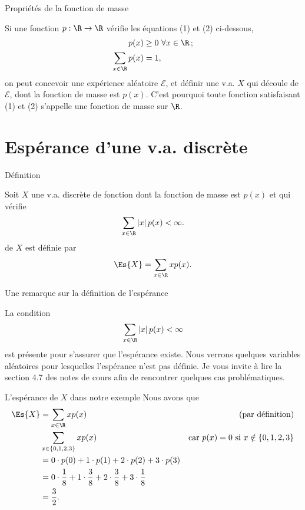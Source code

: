 \documentclass[nuit,charter,pied]{BeamerJS}
\begin{document}
\begin{frame}{Propriétés de la fonction de masse}
	\begin{rem}
		Si une fonction $p:\R\rightarrow \R$ vérifie les équations (1) et (2) ci-dessous,
		\begin{align}
			p(x)&\geq 0~\forall x\in\R\,;\\ 
			\sum_{x\in\R}p(x)&=1,
		\end{align}
		on peut concevoir une expérience aléatoire $\mathcal{E}$, et définir une v.a. $X$ qui découle de $\mathcal{E}$, dont la fonction de masse est $p(x)$. C'est pourquoi toute fonction satisfaisant (1) et (2) s'appelle une fonction de masse sur $\R$.
	\end{rem}
\end{frame}

\section{Espérance d'une v.a. discrète}

\begin{frame}{Définition}
	\begin{defn}
		Soit $X$ une v.a. discrète de fonction dont la fonction de masse est $p(x)$ et qui vérifie
		\[\sum_{x\in\R}|x|\,p(x)<\infty.\]
		 de $X$ est définie par
		\[\Es{X}=\sum_{x\in\R}xp(x).\]
	\end{defn}
	\end{frame}
\begin{frame}{Une remarque sur la définition de l'espérance}
	\begin{rem}
		La condition \[\sum_{x\in\R}|x|\,p(x)<\infty\] est présente pour s'assurer que l'espérance existe. Nous verrons quelques variables aléatoires pour lesquelles l'espérance n'est pas définie. Je vous invite à lire la section 4.7 des notes de cours afin de rencontrer quelques cas problématiques.
	\end{rem}
\end{frame}
\begin{frame}{L'espérance de \(X\) dans notre exemple}
Nous avons que
\begin{align*}
	\Es{X}&=\sum_{x\in\R}xp(x)&\text{(par définition)}\\
	&\sum_{x\in\{0,1,2,3\}}xp(x)&\text{car $p(x)=0$ si $x\notin\{0,1,2,3\}$}\\
	&=0\cdot p(0)+1\cdot p(1)+2\cdot p(2)+3\cdot p(3)\\
	&=0\cdot \frac{1}{8}+1\cdot \frac{3}{8}+2\cdot \frac{3}{8}+3\cdot \frac{1}{8}\\
	&=\frac{3}{2}.
\end{align*}

\end{frame}
\end{document}
